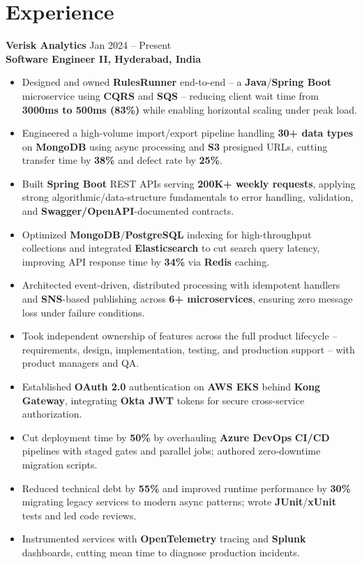 \documentclass[a4paper,10pt]{article}
\begin{document}
\section*{Experience}

\textbf{Verisk Analytics} \hfill Jan 2024 -- Present \\
\textbf{Software Engineer II, Hyderabad, India}

\begin{itemize}[leftmargin=*]
    \item Designed and owned \textbf{RulesRunner} end-to-end -- a \textbf{Java}/\textbf{Spring Boot} microservice using \textbf{CQRS} and \textbf{SQS} -- reducing client wait time from \textbf{3000ms to 500ms (83\%)} while enabling horizontal scaling under peak load.
    \item Engineered a high-volume import/export pipeline handling \textbf{30+ data types} on \textbf{MongoDB} using async processing and \textbf{S3} presigned URLs, cutting transfer time by \textbf{38\%} and defect rate by \textbf{25\%}.
    \item Built \textbf{Spring Boot} REST APIs serving \textbf{200K+ weekly requests}, applying strong algorithmic/data-structure fundamentals to error handling, validation, and \textbf{Swagger/OpenAPI}-documented contracts.
    \item Optimized \textbf{MongoDB}/\textbf{PostgreSQL} indexing for high-throughput collections and integrated \textbf{Elasticsearch} to cut search query latency, improving API response time by \textbf{34\%} via \textbf{Redis} caching.
    \item Architected event-driven, distributed processing with idempotent handlers and \textbf{SNS}-based publishing across \textbf{6+ microservices}, ensuring zero message loss under failure conditions.
    \item Took independent ownership of features across the full product lifecycle -- requirements, design, implementation, testing, and production support -- with product managers and QA.
    \item Established \textbf{OAuth 2.0} authentication on \textbf{AWS EKS} behind \textbf{Kong Gateway}, integrating \textbf{Okta JWT} tokens for secure cross-service authorization.
    \item Cut deployment time by \textbf{50\%} by overhauling \textbf{Azure DevOps} \textbf{CI/CD} pipelines with staged gates and parallel jobs; authored zero-downtime migration scripts.
    \item Reduced technical debt by \textbf{55\%} and improved runtime performance by \textbf{30\%} migrating legacy services to modern async patterns; wrote \textbf{JUnit}/\textbf{xUnit} tests and led code reviews.
    \item Instrumented services with \textbf{OpenTelemetry} tracing and \textbf{Splunk} dashboards, cutting mean time to diagnose production incidents.
\end{itemize}
\end{document}
